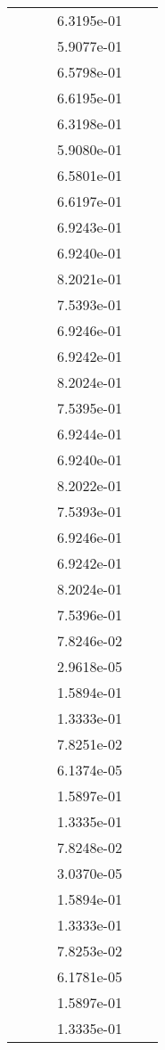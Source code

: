 \begin{xltabular}{\textwidth}{r|rS[table-format=1.3e+2]S[table-format=1.4e+2]S[table-format=1.4e+2]S[table-format=-1.5]}
&  &  & 6.3195e-01 & & \\
&  &  & 5.9077e-01 & & \\
&  &  & 6.5798e-01 & & \\
&  &  & 6.6195e-01 & & \\
&  &  & 6.3198e-01 & & \\
&  &  & 5.9080e-01 & & \\
&  &  & 6.5801e-01 & & \\
&  &  & 6.6197e-01 & & \\
&  &  & 6.9243e-01 & & \\
&  &  & 6.9240e-01 & & \\
&  &  & 8.2021e-01 & & \\
&  &  & 7.5393e-01 & & \\
&  &  & 6.9246e-01 & & \\
&  &  & 6.9242e-01 & & \\
&  &  & 8.2024e-01 & & \\
&  &  & 7.5395e-01 & & \\
&  &  & 6.9244e-01 & & \\
&  &  & 6.9240e-01 & & \\
&  &  & 8.2022e-01 & & \\
&  &  & 7.5393e-01 & & \\
&  &  & 6.9246e-01 & & \\
&  &  & 6.9242e-01 & & \\
&  &  & 8.2024e-01 & & \\
&  &  & 7.5396e-01 & & \\
&  &  & 7.8246e-02 & & \\
&  &  & 2.9618e-05 & & \\
&  &  & 1.5894e-01 & & \\
&  &  & 1.3333e-01 & & \\
&  &  & 7.8251e-02 & & \\
&  &  & 6.1374e-05 & & \\
&  &  & 1.5897e-01 & & \\
&  &  & 1.3335e-01 & & \\
&  &  & 7.8248e-02 & & \\
&  &  & 3.0370e-05 & & \\
&  &  & 1.5894e-01 & & \\
&  &  & 1.3333e-01 & & \\
&  &  & 7.8253e-02 & & \\
&  &  & 6.1781e-05 & & \\
&  &  & 1.5897e-01 & & \\
&  &  & 1.3335e-01 & & \\

\end{xltabular}
